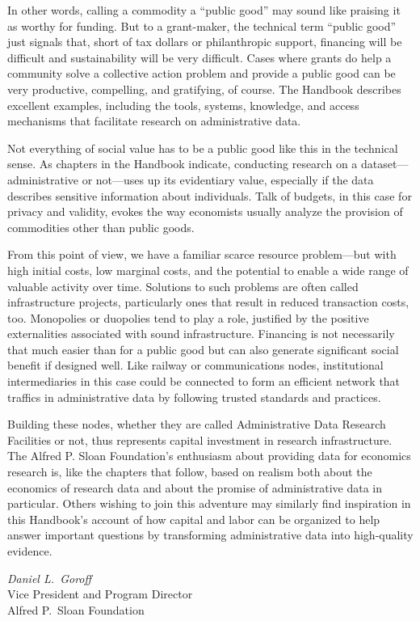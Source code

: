 In other words, calling a commodity a ``public good'' may sound like praising it as worthy for funding. But to a grant-maker, the technical term ``public good'' just signals that, short of tax dollars or philanthropic support, financing will be difficult and sustainability will be very difficult. Cases where grants do help a community solve a collective action problem and provide a public good can be very productive, compelling, and gratifying, of course. The Handbook describes excellent examples, including the tools, systems, knowledge, and access mechanisms that facilitate research on administrative data.

Not everything of social value has to be a public good like this in the technical sense. As chapters in the Handbook indicate, conducting research on a dataset---administrative or not---uses up its evidentiary value, especially if the data describes sensitive information about individuals. Talk of budgets, in this case for privacy and validity, evokes the way economists usually analyze the provision of commodities other than public goods.

From this point of view, we have a familiar scarce resource problem---but with high initial costs, low marginal costs, and the potential to enable a wide range of valuable activity over time. Solutions to such problems are often called infrastructure projects, particularly ones that result in reduced transaction costs, too. Monopolies or duopolies tend to play a role, justified by the positive externalities associated with sound infrastructure. Financing is not necessarily that much easier than for a public good but can also generate significant social benefit if designed well. Like railway or communications nodes, institutional intermediaries in this case could be connected to form an efficient network that traffics in administrative data by following trusted standards and practices.

Building these nodes, whether they are called Administrative Data Research Facilities or not, thus represents capital investment in research infrastructure. The Alfred P. Sloan Foundation's enthusiasm about providing data for economics research is, like the chapters that follow, based on realism both about the economics of research data and about the promise of administrative data in particular. Others wishing to join this adventure may similarly find inspiration in this Handbook's account of how capital and labor can be organized to help answer important questions by transforming administrative data into high-quality evidence.

\emph{Daniel L.\ Goroff}\\
Vice President and Program Director\\
Alfred P.\ Sloan Foundation
